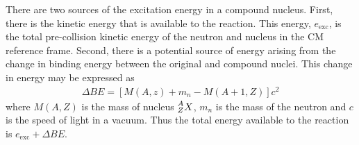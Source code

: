 \documentclass[11pt]{article}
\newcommand\leftidx[3]{{\vphantom{#2}}#1#2#3}
\begin{document}
There are two sources of the excitation energy in a compound nucleus.  First, there is the kinetic energy that is available to the reaction.  This energy, \(e_{\text{exc}}\), is the total pre-collision kinetic energy of the neutron and nucleus in the CM reference frame.  Second, there is a potential source of energy arising from the change in binding energy between the original and compound nuclei.  This change in energy may be expressed as
\begin{align}
  \Delta BE = \left[ M(A,z) + m_n - M(A+1,Z) \right] c^2
\end{align}
where \(M(A,Z)\) is the mass of nucleus \(\leftidx{^A_Z}{X}{}\), \(m_n\) is the mass of the neutron and \(c\) is the speed of light in a vacuum.  Thus the total energy available to the reaction is \(e_{\text{exc}} + \Delta BE\).
\end{document}
